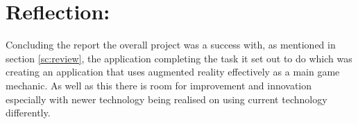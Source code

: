 \section{Reflection:}\label{sc:reflection}




Concluding the report the overall project was a success with, as mentioned in section \ref{sc:review}, the application completing the task it set out to do which was creating an application that uses augmented reality effectively as a main game mechanic.
As well as this there is room for improvement and innovation especially with newer technology being realised on using current technology differently.
